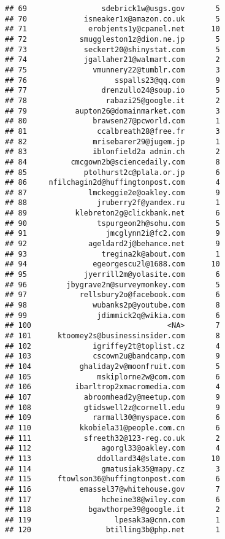 \documentclass[]{article}
\begin{document}
\begin{verbatim}
## 69                 sdebrick1w@usgs.gov       5
## 70             isneaker1x@amazon.co.uk       5
## 71              erobjents1y@cpanel.net      10
## 72            smuggleston1z@dion.ne.jp       5
## 73             seckert20@shinystat.com       5
## 74             jgallaher21@walmart.com       2
## 75               vmunnery22@tumblr.com       3
## 76                    sspalls23@qq.com       9
## 77                 drenzullo24@soup.io       5
## 78                  rabazi25@google.it       2
## 79           aupton26@domainmarket.com       3
## 80               brawsen27@pcworld.com       1
## 81                ccalbreath28@free.fr       3
## 82               mrisebarer29@jugem.jp       1
## 83               iblonfield2a admin.ch       2
## 84          cmcgown2b@sciencedaily.com       8
## 85             ptolhurst2c@plala.or.jp       6
## 86     nfilchagin2d@huffingtonpost.com       4
## 87              lmckeggie2e@oakley.com       9
## 88                jruberry2f@yandex.ru       1
## 89           klebreton2g@clickbank.net       6
## 90                tspurgeon2h@sohu.com       5
## 91                  jmcglynn2i@fc2.com       9
## 92              ageldard2j@behance.net       9
## 93                 tregina2k@about.com       1
## 94               egeorgescu2l@1688.com      10
## 95             jyerrill2m@yolasite.com       6
## 96         jbygrave2n@surveymonkey.com       5
## 97            rellsbury2o@facebook.com       6
## 98               wubanks2p@youtube.com       8
## 99                jdimmick2q@wikia.com       6
## 100                               <NA>       7
## 101      ktoomey2s@businessinsider.com       8
## 102              igriffey2t@toplist.cz       4
## 103              cscown2u@bandcamp.com       9
## 104           ghaliday2v@moonfruit.com       5
## 105               mskiplorne2w@com.com       6
## 106          ibarltrop2xmacromedia.com       4
## 107            abroomhead2y@meetup.com       9
## 108            gtidswell2z@cornell.edu       9
## 109              rarmall30@myspace.com       6
## 110           kkobiela31@people.com.cn       6
## 111            sfreeth32@123-reg.co.uk       2
## 112                agorgl33@oakley.com       4
## 113               ddollard34@slate.com      10
## 114                gmatusiak35@mapy.cz       3
## 115      ftowlson36@huffingtonpost.com       6
## 116           emassel37@whitehouse.gov       7
## 117                hcheine38@wiley.com       6
## 118             bgawthorpe39@google.it       2
## 119                   lpesak3a@cnn.com       1
## 120                 btilling3b@php.net       1

\end{verbatim}
\end{document}
